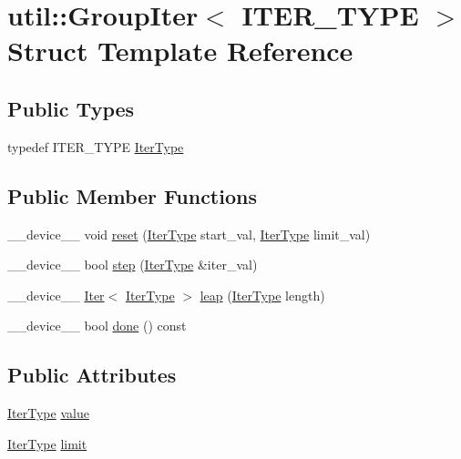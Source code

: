 \hypertarget{structutil_1_1GroupIter}{\section{util\-:\-:Group\-Iter$<$ I\-T\-E\-R\-\_\-\-T\-Y\-P\-E $>$ Struct Template Reference}
\label{structutil_1_1GroupIter}
}
\subsection*{Public Types}
\begin{DoxyCompactItemize}
\item 
typedef I\-T\-E\-R\-\_\-\-T\-Y\-P\-E \hyperlink{structutil_1_1GroupIter_a69f8c8fcb507bd86932800705e59dfda}{Iter\-Type}
\end{DoxyCompactItemize}
\subsection*{Public Member Functions}
\begin{DoxyCompactItemize}
\item 
\-\_\-\-\_\-device\-\_\-\-\_\- void \hyperlink{structutil_1_1GroupIter_a3ee760ac8e132ae8e4ea2ace9806a575}{reset} (\hyperlink{structutil_1_1GroupIter_a69f8c8fcb507bd86932800705e59dfda}{Iter\-Type} start\-\_\-val, \hyperlink{structutil_1_1GroupIter_a69f8c8fcb507bd86932800705e59dfda}{Iter\-Type} limit\-\_\-val)
\item 
\-\_\-\-\_\-device\-\_\-\-\_\- bool \hyperlink{structutil_1_1GroupIter_a7b2c62e8198ee22afff4f4a73cf956e1}{step} (\hyperlink{structutil_1_1GroupIter_a69f8c8fcb507bd86932800705e59dfda}{Iter\-Type} \&iter\-\_\-val)
\item 
\-\_\-\-\_\-device\-\_\-\-\_\- \hyperlink{structutil_1_1Iter}{Iter}$<$ \hyperlink{structutil_1_1GroupIter_a69f8c8fcb507bd86932800705e59dfda}{Iter\-Type} $>$ \hyperlink{structutil_1_1GroupIter_ad8505cba5581f45cec9ea44d397156c8}{leap} (\hyperlink{structutil_1_1GroupIter_a69f8c8fcb507bd86932800705e59dfda}{Iter\-Type} length)
\item 
\-\_\-\-\_\-device\-\_\-\-\_\- bool \hyperlink{structutil_1_1GroupIter_aae8ceb99fe259d016df33755ea84a3d3}{done} () const 
\end{DoxyCompactItemize}
\subsection*{Public Attributes}
\begin{DoxyCompactItemize}
\item 
\hyperlink{structutil_1_1GroupIter_a69f8c8fcb507bd86932800705e59dfda}{Iter\-Type} \hyperlink{structutil_1_1GroupIter_a92b7fd4ab2dbe1069ca20c74f33ba89b}{value}
\item 
\hyperlink{structutil_1_1GroupIter_a69f8c8fcb507bd86932800705e59dfda}{Iter\-Type} \hyperlink{structutil_1_1GroupIter_a87e99ee7ed54669c53aa438b2c19f903}{limit}
\end{DoxyCompactItemize}


